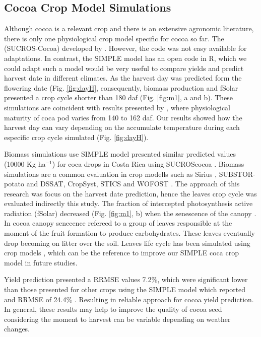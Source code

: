 \documentclass[gene,journal,article,submit,moreauthors,pdftex]{Definitions/mdpi}
\begin{document}
\subsection{Cocoa Crop Model Simulations}
Although cocoa is a relevant crop and there is an extensive agronomic literature, there is only one physiological crop model specific for cocoa so far. The (SUCROS-Cocoa) developed by \cite{zuidema2005}. However, the code was not easy available for adaptations. In contrast, the SIMPLE model has an open code in R, which we could adapt such a model would be very useful to compare yields and predict harvest date in different climates. As the harvest day was predicted form the flowering date (Fig. \ref{fig:dayH}, consequently, biomass production and fSolar presented a crop cycle shorter than 180 daf (Fig. \ref{fig:m1}, a and b). These simulations are coincident with results presented by \cite{lopez2018}, where physiological maturity of coca pod varies from 140 to 162 daf.  Our results showed how the harvest day can vary depending on the accumulate temperature during each especific crop cycle simulated (Fig. \ref{fig:dayH}).

 
Biomass simulations use SIMPLE model presented similar predicted values (10000 Kg ha$^{-1}$) for coca drops in Costa Rica using SUCROScocoa \citep{zuidema2005}. Biomass simulations are a common evaluation in crop modells such as Sirius \citep{Crout20142}, SUBSTOR-potato \citep{Raymundo2017} and  DSSAT, CropSyst, STICS and WOFOST \citep{Confalonieri2016}. The approach of this research was focus  on the harvest date prediction, hence the leaves crop cycle was evaluated indirectly this study. The fraction of intercepted photosynthesis active radiation (fSolar) decreased (Fig. \ref{fig:m1}, b) when the senescence of the canopy \citep{zuidema2005}. In cocoa canopy senecence  refereed to  a group of leaves responsible  at the moment of the fruit formation to produce carbohydrates. These leaves eventually drop becoming on litter over the soil. Leaves life cycle has been simulated using crop models \citep{Crout2010, zuidema2005}, which can be the reference to improve our SIMPLE coca crop model in future studies.   

Yield prediction presented a RRMSE values 7.2\%, which were significant lower than those  presented for other crops using the SIMPLE model which reported and RRMSE of 24.4\% \citep{Zao2019simple}. Resulting in reliable approach for cocoa yield prediction. In general, these results may help to improve the quality of cocoa seed considering the moment to harvest can be variable depending on weather changes.  
\end{document}
